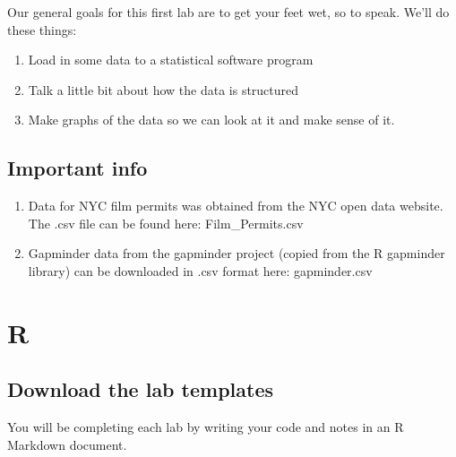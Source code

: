 \documentclass[]{book}
\providecommand{\tightlist}{%
  \setlength{\itemsep}{0pt}\setlength{\parskip}{0pt}}
\begin{document}
Our general goals for this first lab are to get your feet wet, so to
speak. We'll do these things:

\begin{enumerate}
\def\labelenumi{\arabic{enumi}.}
\tightlist
\item
  Load in some data to a statistical software program
\item
  Talk a little bit about how the data is structured
\item
  Make graphs of the data so we can look at it and make sense of it.
\end{enumerate}

\subsection{Important info}\label{important-info}

\begin{enumerate}
\def\labelenumi{\arabic{enumi}.}
\item
  Data for NYC film permits was obtained from the NYC open data website.
  The .csv file can be found here: Film\_Permits.csv
\item
  Gapminder data from the gapminder project (copied from the R gapminder
  library) can be downloaded in .csv format here: gapminder.csv
\end{enumerate}

\section{R}\label{r-1}

\subsection{Download the lab
templates}\label{download-the-lab-templates}

You will be completing each lab by writing your code and notes in an R
Markdown document.
\end{document}
